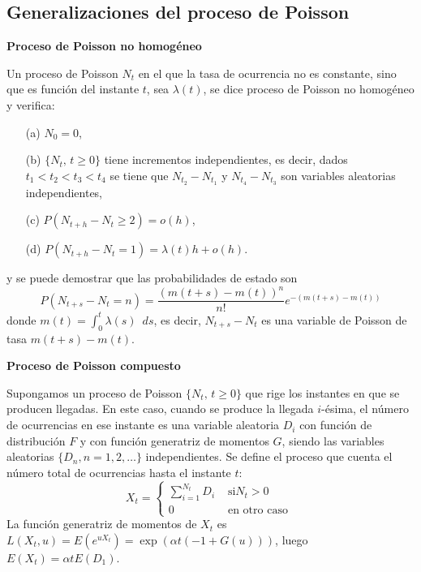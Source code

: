 \subsection{Generalizaciones del proceso de Poisson}
{\bf Proceso de Poisson no homog\'{e}neo}
\par
Un proceso de Poisson $N_t$ en el que la tasa de ocurrencia no es
constante, sino que es funci\'{o}n del instante $t$, sea $\lambda(t)$,
se dice proceso de Poisson no homog\'{e}neo y verifica:
\begin{enumerate}
  \item[(a)] $N_0=0$,
  \item[(b)] $\{N_t,\,t\geq 0\}$ tiene incrementos independientes, es decir, dados
$t_1<t_2<t_3<t_4$ se tiene que $N_{t_2}-N_{t_1}$ y
$N_{t_4}-N_{t_3}$ son variables aleatorias independientes,
  \item[(c)] $P(N_{t+h}-N_t\geq 2)=o(h)$,
  \item[(d)] $P(N_{t+h}-N_t=1)=\lambda(t)h+o(h)$.
\end{enumerate}
y se puede demostrar que las probabilidades de estado son
\[
P(N_{t+s}-N_t=n)=\dfrac{(m(t+s)-m(t))^n}{n!}e^{-(m(t+s)-m(t))}
\]
donde $m(t)=\displaystyle \int_0^t \lambda(s)\enspace ds$, es
decir, $N_{t+s}-N_t$ es una variable de Poisson de tasa
$m(t+s)-m(t)$.
\par
{\bf Proceso de Poisson compuesto}
\par
Supongamos un proceso de Poisson $\{N_t,\,t\geq 0\}$ que rige los
instantes en que se producen llegadas. En este caso, cuando se
produce la llegada $i$-\'{e}sima, el n\'{u}mero de ocurrencias en ese
instante es una variable aleatoria $D_i$ con funci\'{o}n de
distribuci\'{o}n $F$ y con funci\'{o}n generatriz de momentos $G$, siendo
las variables aleatorias $\{D_n,n=1,2,\ldots\}$ independientes.
Se define el proceso que cuenta el n\'{u}mero total de ocurrencias
hasta el instante $t$:
\[
X_t=\left \{ \begin{array}{ll} \displaystyle\sum_{i=1}^{N_t}D_i&
\text{ si
}N_t>0\\[5pt]
0& \text{ en otro caso }\end{array} \right.
\]
La funci\'{o}n generatriz de momentos de $X_t$ es
$L(X_t,u)=E(e^{uX_t})=\exp{(\alpha t(-1+G(u)))}$, luego
$E(X_t)=\alpha t E(D_1)$.
